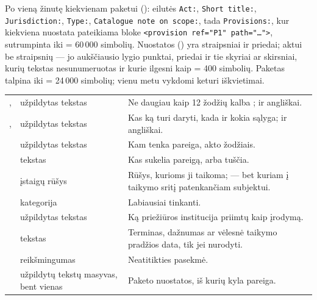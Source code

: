  Po vieną žinutę kiekvienam paketui ():
eilutės \texttt{Act:}, \texttt{Short title:}, \texttt{Jurisdiction:}, \texttt{Type:},
\texttt{Catalogue note on scope:}, tada \texttt{Provisions:}, kur kiekviena nuostata pateikiama
bloke \texttt{<provision ref="P1" path="…">}, sutrumpinta iki  =
60\,000 simbolių. Nuostatos () yra straipsniai ir priedai; aktui be
straipsnių --- jo aukščiausio lygio punktai, priedai ir tie skyriai ar skirsniai, kurių tekstas
nesunumeruotas ir kurie ilgesni kaip  = 400 simbolių. Paketas talpina
iki  = 24\,000 simbolių; vienu metu vykdomi keturi iškvietimai.

\par\nopagebreak
\begin{xltabular}{\textwidth}{@{}L{40mm}L{28mm}Y@{}}
\toprule
{} &  &  \\
\midrule
\endhead
\bottomrule
\endlastfoot
{},  & užpildytas tekstas & Ne daugiau kaip 12 žodžių kalba ; ir angliškai. \\
,  & užpildytas tekstas & Kas ką turi daryti, kada ir kokia sąlyga; ir angliškai. \\
 & užpildytas tekstas & Kam tenka pareiga, akto žodžiais. \\
 & tekstas & Kas sukelia pareigą, arba tuščia. \\
 & įstaigų rūšys & Rūšys, kurioms ji taikoma;  --- bet kuriam į taikymo sritį patenkančiam subjektui. \\
 & kategorija & Labiausiai tinkanti. \\
 & užpildytas tekstas & Ką priežiūros institucija priimtų kaip įrodymą. \\
 & tekstas & Terminas, dažnumas ar vėlesnė taikymo pradžios data, tik jei nurodyti. \\
 & reikšmingumas & Neatitikties pasekmė. \\
 & užpildytų tekstų masyvas, bent vienas & Paketo nuostatos, iš kurių kyla pareiga. \\
\end{xltabular}

